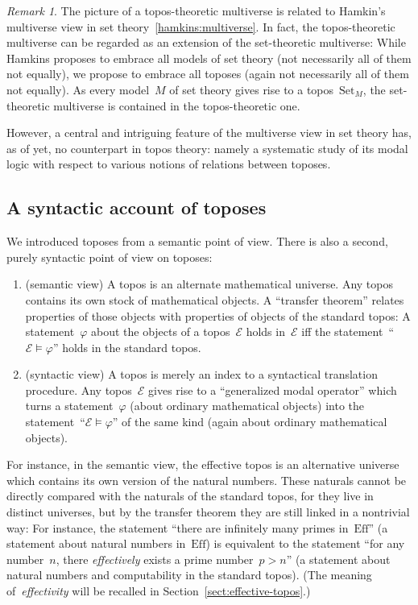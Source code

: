\documentclass[oneside,reqno]{amsart}
\theoremstyle{definition}
\theoremstyle{plain}
\theoremstyle{remark}
\newtheorem{rem}[defn]{Remark}
\newcommand{\E}{\mathcal{E}}
\newcommand{\Set}{\mathrm{Set}}
\newcommand{\Eff}{\mathrm{Ef{}f}}
\renewcommand{\_}{\mathpunct{.}\,}
\newcommand{\effective}{ef{}fective\xspace}
\newcommand{\effectively}{ef{}fectively\xspace}
\newcommand{\?}{\,{:}\,}
\begin{document}
\begin{rem}The picture of a topos-theoretic multiverse is related to Hamkin's
multiverse view in set theory~\ref{hamkins:multiverse}. In fact, the
topos-theoretic multiverse can be regarded as an extension of the set-theoretic
multiverse: While Hamkins proposes to embrace all models of set theory (not
necessarily all of them not equally), we propose to embrace all toposes (again
not necessarily all of them not equally). As every model~$M$ of set theory
gives rise to a topos~$\Set_M$, the set-theoretic multiverse is contained in the
topos-theoretic one.

However, a central and intriguing feature of the multiverse view in set theory
has, as of yet, no counterpart in topos theory: namely a systematic study of
its modal logic with respect to various notions of relations between toposes.\end{rem}


\subsection{A syntactic account of toposes} We introduced toposes from a semantic
point of view. There is also a second, purely syntactic point of view on
toposes:
\begin{enumerate}
\item (semantic view) A topos is an alternate mathematical universe. Any topos
contains its own stock of mathematical objects. A ``transfer theorem'' relates
properties of those objects with properties of objects of the standard topos: A
statement~$\varphi$ about the objects of a topos~$\E$ holds in~$\E$ iff the
statement~``$\E \models \varphi$'' holds in the standard topos.
\item (syntactic view) A topos is merely an index to a syntactical translation
procedure. Any topos~$\E$ gives rise to a ``generalized modal operator'' which
turns a statement~$\varphi$ (about ordinary mathematical objects) into the
statement~``$\E \models \varphi$'' of the same kind (again about ordinary
mathematical objects).
\end{enumerate}

For instance, in the semantic view, the \effective topos is an alternative
universe which contains its own version of the natural numbers. These naturals
cannot be directly compared with the naturals of the standard topos, for they
live in distinct universes, but by the transfer theorem they are still linked in a
nontrivial way: For instance, the statement ``there are infinitely many primes
in~$\Eff$'' (a statement about natural numbers in~$\Eff$) is equivalent to the statement
``for any number~$n$, there \emph{\effectively} exists a prime number~$p > n$''
(a statement about natural numbers and computability in the standard topos).
(The meaning of~\emph{effectivity} will be recalled in
Section~\ref{sect:effective-topos}.)
\end{document}
